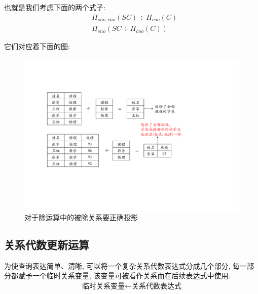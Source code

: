 也就是我们考虑下面的两个式子:
\begin{align*}
    &\Pi_{sno,cno}(SC) \div \Pi_{cno}(C)\\
    &\Pi_{sno}(SC\div \Pi_{cno}(C))
\end{align*}

它们对应着下面的图:
\begin{figure}[H]
    \centering
    \includegraphics[width=.7\textwidth]{./figure/除法要求.pdf}
    \caption{对于除运算中的被除关系要正确投影}
\end{figure}

\subsection{关系代数更新运算}

\begin{definition}[赋值运算]
为使查询表达简单、清晰, 可以将一个复杂关系代数表达式分成几个部分, 每一部分都赋予一个临时关系变量, 该变量可被看作关系而在后续表达式中使用.
\begin{align*}
    \text{临时关系变量} \leftarrow \text{关系代数表达式}
\end{align*}
\end{definition}

